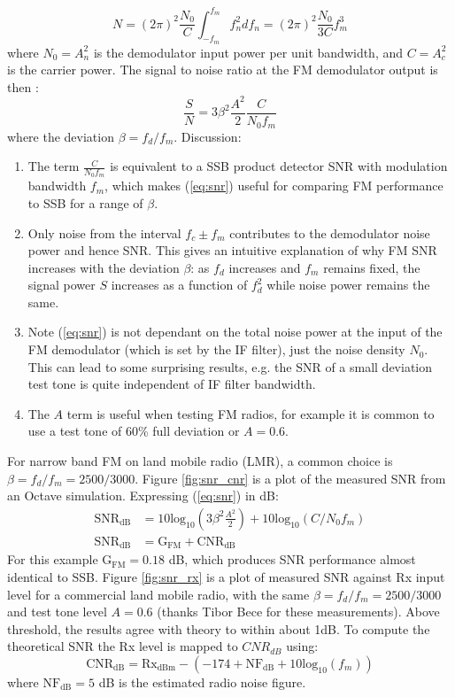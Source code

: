 \documentclass{article}
\begin{document}
\begin{equation}
N = (2\pi)^2 \frac{N_0}{C} \int_{-f_m}^{f_m} f_n^2 df_n = (2\pi)^2 \frac{N_0}{3C} f_m^3
\end{equation}
where $N_0=A_n^2$ is the demodulator input power per unit bandwidth, and $C=A_c^2$ is the carrier power.  The signal to noise ratio at the FM demodulator output is then \cite{crilly2009communication}:
\begin{equation}
\label{eq:snr}
\frac{S}{N} = 3 \beta^2 \frac{A^2}{2} \frac{C}{N_0 f_m}
\end{equation}
where the deviation $\beta=f_d/f_m$. Discussion:
\begin{enumerate}
\item The term $\frac{C}{N_0 f_m}$ is equivalent to a SSB product detector SNR with modulation bandwidth $f_m$, which makes (\ref{eq:snr}) useful for comparing FM performance to SSB for a range of $\beta$.
\item Only noise from the interval $f_c \pm f_m$ contributes to the demodulator noise power and hence SNR. This gives an intuitive explanation of why FM SNR increases with the deviation $\beta$: as $f_d$ increases and $f_m$ remains fixed, the signal power $S$ increases as a function of $f_d^2$ while noise power remains the same.
\item Note (\ref{eq:snr}) is not dependant on the total noise power at the input of the FM demodulator (which is set by the IF filter), just the noise density $N_0$.  This can lead to some surprising results, e.g. the SNR of a small deviation test tone is quite independent of IF filter bandwidth.
\item The $A$ term is useful when testing FM radios, for example it is common to use a test tone of 60\% full deviation or $A=0.6$.
\end{enumerate}

For narrow band FM on land mobile radio (LMR), a common choice is $\beta=f_d/f_m=2500/3000$.  Figure \ref{fig:snr_cnr} is a plot of the measured SNR from an Octave simulation. Expressing (\ref{eq:snr}) in dB:
\begin{equation}
\begin{split}
\mathrm{SNR_{dB}} &= 10\mathrm{log_{10}}\left( 3 \beta^2 \frac{A^2}{2} \right) + 10\mathrm{log_{10}}(C/N_0f_m) \\
\mathrm{SNR_{dB}} &= \mathrm{G_{FM}} + \mathrm{CNR_{dB}}
\end{split}
\end{equation}
For this example $\mathrm{G_{FM}}=0.18$ dB, which produces SNR performance almost identical to SSB. Figure \ref{fig:snr_rx} is a plot of measured SNR against Rx input level for a commercial land mobile radio, with the same $\beta=f_d/f_m=2500/3000$ and test tone level $A=0.6$ (thanks Tibor Bece for these measurements).  Above threshold, the results agree with theory to within about 1dB. To compute the theoretical SNR the Rx level is mapped to $CNR_{dB}$ using:
\begin{equation}
\mathrm{CNR_{dB}} = \mathrm{Rx_{dBm}} - (-174 + \mathrm{NF_{dB}} + 10\mathrm{log_{10}}(f_m)) 
\end{equation}
where $\mathrm{NF_{dB}}=5$ dB is the estimated radio noise figure.
\end{document}

